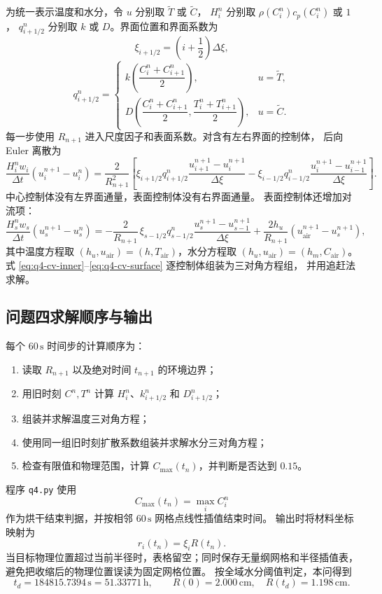 \documentclass[UTF8,a4paper,11pt]{ctexart}
\numberwithin{equation}{section}
\begin{document}
为统一表示温度和水分，令 \(u\) 分别取
\(\widetilde T\) 或 \(\widetilde C\)，
\(H_i^n\) 分别取 \(\rho(C_i^n)c_p(C_i^n)\) 或 \(1\)，
\(q_{i+1/2}^n\) 分别取 \(k\) 或 \(D\)。界面位置和界面系数为
\[
\xi_{i+1/2}=\left(i+\frac12\right)\Delta\xi,
\]
\begin{equation}
q_{i+1/2}^n=
\begin{cases}
k\left(\dfrac{C_i^n+C_{i+1}^n}{2}\right),&u=\widetilde T,\\[7pt]
D\left(\dfrac{C_i^n+C_{i+1}^n}{2},
\dfrac{T_i^n+T_{i+1}^n}{2}\right),&u=\widetilde C.
\end{cases}
\label{eq:q4-qface}
\end{equation}
每一步使用 \(R_{n+1}\) 进入尺度因子和表面系数。对含有左右界面的控制体，
后向 Euler 离散为
\begin{equation}
\frac{H_i^nw_i}{\Delta t}(u_i^{n+1}-u_i^n)
=\frac{2}{R_{n+1}^2}
\left[
\xi_{i+1/2}q_{i+1/2}^n
\frac{u_{i+1}^{n+1}-u_i^{n+1}}{\Delta\xi}
-\xi_{i-1/2}q_{i-1/2}^n
\frac{u_i^{n+1}-u_{i-1}^{n+1}}{\Delta\xi}
\right].
\label{eq:q4-cv-inner}
\end{equation}
中心控制体没有左界面通量，表面控制体没有右界面通量。
表面控制体还增加对流项：
\begin{equation}
\frac{H_s^nw_s}{\Delta t}(u_s^{n+1}-u_s^n)
=-\frac{2}{R_{n+1}}\,
\xi_{s-1/2}q_{s-1/2}^n
\frac{u_s^{n+1}-u_{s-1}^{n+1}}{\Delta\xi}
+\frac{2h_u}{R_{n+1}}
(u_{\mathrm{air}}^{n+1}-u_s^{n+1}),
\label{eq:q4-cv-surface}
\end{equation}
其中温度方程取
\((h_u,u_{\mathrm{air}})=(h,T_{\mathrm{air}})\)，水分方程取
\((h_u,u_{\mathrm{air}})=(h_m,C_{\mathrm{air}})\)。
式 \eqref{eq:q4-cv-inner}--\eqref{eq:q4-cv-surface} 逐控制体组装为三对角方程组，
并用追赶法求解。

\subsection{问题四求解顺序与输出}

每个 \(60\,\mathrm{s}\) 时间步的计算顺序为：
\begin{enumerate}[label=\arabic*.,leftmargin=3em]
\item 读取 \(R_{n+1}\) 以及绝对时间 \(t_{n+1}\) 的环境边界；
\item 用旧时刻 \(C^n,T^n\) 计算 \(H_i^n\)、\(k_{i+1/2}^n\) 和 \(D_{i+1/2}^n\)；
\item 组装并求解温度三对角方程；
\item 使用同一组旧时刻扩散系数组装并求解水分三对角方程；
\item 检查有限值和物理范围，计算 \(C_{\max}(t_n)\)，并判断是否达到 \(0.15\)。
\end{enumerate}
程序 \texttt{q4.py} 使用
\[
C_{\max}(t_n)=\max_i C_i^n
\]
作为烘干结束判据，并按相邻 \(60\,\mathrm{s}\) 网格点线性插值结束时间。
输出时将材料坐标映射为
\[
r_i(t_n)=\xi_iR(t_n).
\]
当目标物理位置超过当前半径时，表格留空；同时保存无量纲网格和半径插值表，
避免把收缩后的物理位置误读为固定网格位置。
按全域水分阈值判定，本问得到
\[
t_d=184815.7394\,\mathrm{s}=51.33771\,\mathrm{h},
\qquad
R(0)=2.000\,\mathrm{cm},\quad R(t_d)=1.198\,\mathrm{cm}.
\]
\end{document}
